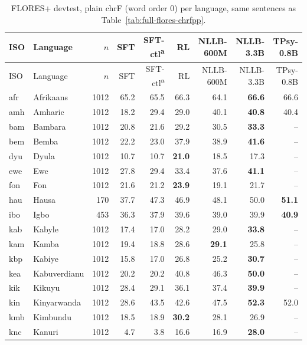 {\scriptsize\renewcommand{\arraystretch}{0.95}\setlength{\tabcolsep}{2pt}
\begin{longtable}{@{}llrrrrrrr@{}}
\caption{FLORES+ devtest, plain chrF (word order 0) per language, same sentences as Table~\ref{tab:full-flores-chrfpp}.}\label{tab:full-flores-chrf}\\
\toprule
ISO & Language & $n$ & SFT & SFT-ctl\textsuperscript{a} & RL & NLLB-600M & NLLB-3.3B & TPsy-0.8B \\
\midrule\endfirsthead
\toprule
ISO & Language & $n$ & SFT & SFT-ctl\textsuperscript{a} & RL & NLLB-600M & NLLB-3.3B & TPsy-0.8B \\
\midrule\endhead
\midrule\endfoot
\bottomrule\endlastfoot
afr & Afrikaans & 1012 & 65.2 & 65.5 & 66.3 & 64.1 & \textbf{66.6} & 66.6 \\
amh & Amharic & 1012 & 18.2 & 29.4 & 29.0 & 40.1 & \textbf{40.8} & 40.4 \\
bam & Bambara & 1012 & 20.8 & 21.6 & 29.2 & 30.5 & \textbf{33.3} & -- \\
bem & Bemba & 1012 & 22.2 & 23.0 & 37.9 & 38.9 & \textbf{41.6} & -- \\
dyu & Dyula & 1012 & 10.7 & 10.7 & \textbf{21.0} & 18.5 & 17.3 & -- \\
ewe & Ewe & 1012 & 27.8 & 29.4 & 33.4 & 37.6 & \textbf{41.1} & -- \\
fon & Fon & 1012 & 21.6 & 21.2 & \textbf{23.9} & 19.1 & 21.7 & -- \\
hau & Hausa & 170 & 37.7 & 47.3 & 46.9 & 48.1 & 50.0 & \textbf{51.1} \\
ibo & Igbo & 453 & 36.3 & 37.9 & 39.6 & 39.0 & 39.9 & \textbf{40.9} \\
kab & Kabyle & 1012 & 17.4 & 17.0 & 28.2 & 29.0 & \textbf{33.8} & -- \\
kam & Kamba & 1012 & 19.4 & 18.8 & 28.6 & \textbf{29.1} & 25.8 & -- \\
kbp & Kabiye & 1012 & 15.8 & 17.0 & 26.8 & 25.2 & \textbf{30.7} & -- \\
kea & Kabuverdianu & 1012 & 20.2 & 20.2 & 40.8 & 46.3 & \textbf{50.0} & -- \\
kik & Kikuyu & 1012 & 28.4 & 29.1 & 36.1 & 37.4 & \textbf{39.9} & -- \\
kin & Kinyarwanda & 1012 & 28.6 & 43.5 & 42.6 & 47.5 & \textbf{52.3} & 52.0 \\
kmb & Kimbundu & 1012 & 18.5 & 18.9 & \textbf{30.2} & 28.1 & 26.9 & -- \\
knc & Kanuri & 1012 & 4.7 & 3.8 & 16.6 & 16.9 & \textbf{28.0} & -- \\

\end{longtable}}
